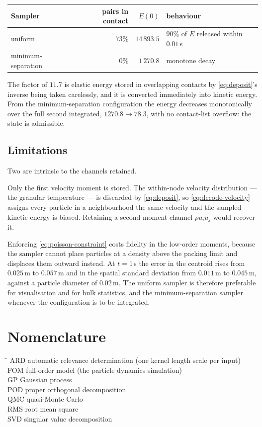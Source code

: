 \documentclass[11pt]{article}
\begin{document}
\begin{center}
\begin{tabular}{lrrl}
\toprule
Sampler & pairs in contact & $E(0)$ & behaviour \\
\midrule
uniform & $73\%$ & $14\,893.5$ & $90\%$ of $E$ released within $0.01$\,s \\
minimum-separation & $0\%$ & $1\,270.8$ & monotone decay \\
\bottomrule
\end{tabular}
\end{center}

The factor of $11.7$ is elastic energy stored in overlapping contacts by \eqref{eq:deposit}'s inverse
being taken carelessly, and it is converted immediately into kinetic energy. From the
minimum-separation configuration the energy decreases monotonically over the full second integrated,
$1270.8 \to 78.3$, with no contact-list overflow: the state is admissible.

\subsection{Limitations}

Two are intrinsic to the channels retained.

Only the first velocity moment is stored. The within-node velocity distribution --- the granular
temperature --- is discarded by \eqref{eq:deposit}, so \eqref{eq:decode-velocity} assigns every
particle in a neighbourhood the same velocity and the sampled kinetic energy is biased. Retaining a
second-moment channel $\rho u_i u_j$ would recover it.

Enforcing \eqref{eq:poisson-constraint} costs fidelity in the low-order moments, because the sampler
cannot place particles at a density above the packing limit and displaces them outward instead. At
$t = 1$\,s the error in the centroid rises from $0.025$\,m to $0.057$\,m and in the spatial standard
deviation from $0.011$\,m to $0.045$\,m, against a particle diameter of $0.02$\,m. The uniform sampler
is therefore preferable for visualisation and for bulk statistics, and the minimum-separation sampler
whenever the configuration is to be integrated.

\section*{Nomenclature}

\begin{tabbing}
\hspace{2.6cm} \= \kill
ARD \> automatic relevance determination (one kernel length scale per input) \\
FOM \> full-order model (the particle dynamics simulation) \\
GP \> Gaussian process \\
POD \> proper orthogonal decomposition \\
QMC \> quasi-Monte Carlo \\
RMS \> root mean square \\
SVD \> singular value decomposition \\
\end{tabbing}
\end{document}
